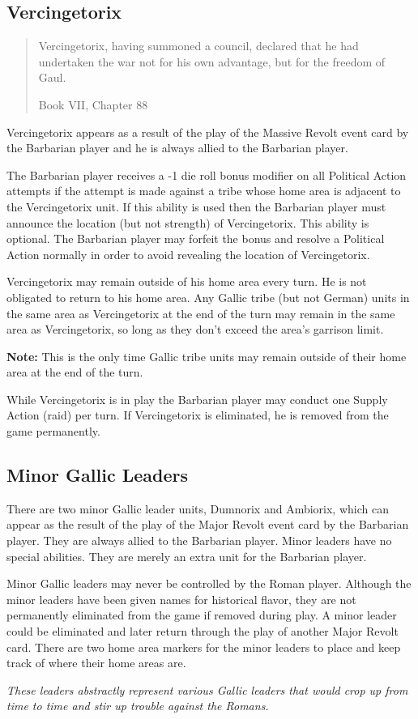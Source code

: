 \subsection{Vercingetorix}
\blockquote[Book VII, Chapter 88]{Vercingetorix, having summoned a council, declared that he had undertaken the war not for his own advantage, but for the freedom of Gaul.}
\par
Vercingetorix appears as a result of the play of the Massive Revolt event card by the Barbarian player and he is always allied to the Barbarian player.

The Barbarian player receives a -1 die roll bonus modifier on all Political Action attempts if the attempt is made against a tribe whose home area is adjacent to the Vercingetorix unit. If this ability is used then the Barbarian player must announce the location (but not strength) of Vercingetorix. This ability is optional. The Barbarian player may forfeit the bonus and resolve a Political Action normally in order to avoid revealing the location of Vercingetorix.

Vercingetorix may remain outside of his home area every turn. He is not obligated to return to his home area. Any Gallic tribe (but not German) units in the same area as Vercingetorix at the end of the turn may remain in the same area as Vercingetorix, so long as they don’t exceed the area’s garrison limit.

\textbf{Note:} This is the only time Gallic tribe units may remain outside of their home area at the end of the turn.

While Vercingetorix is in play the Barbarian player may conduct one Supply Action (raid) per turn. If Vercingetorix is eliminated, he is removed from the game permanently.

\subsection{Minor Gallic Leaders}
\par
There are two minor Gallic leader units, Dumnorix and Ambiorix, which can appear as the result of the play of the Major Revolt event card by the Barbarian player. They are always allied to the Barbarian player. Minor leaders have no special abilities. They are merely an extra unit for the Barbarian player.

Minor Gallic leaders may never be controlled by the Roman player. Although the minor leaders have been given names for historical flavor, they are not permanently eliminated from the game if removed during play. A minor leader could be eliminated and later return through the play of another Major Revolt card. There are two home area markers for the minor leaders to place and keep track of where their home areas are.

\textit{These leaders abstractly represent various Gallic leaders that would crop up from time to time and stir up trouble against the Romans.}
